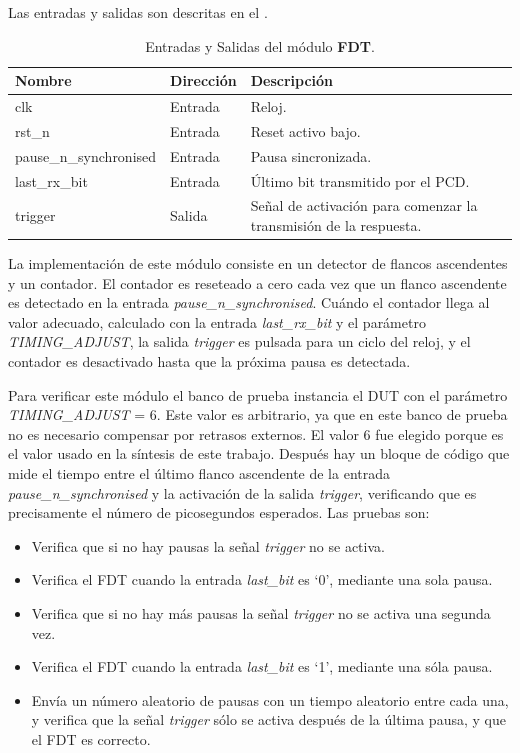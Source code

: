 \documentclass[a4paper, twoside, 11pt]{report}
\begin{document}
Las entradas y salidas son descritas en el .

\begin{table}[htb]
  \centering
  \tablezebra
  \begin{tabulary}{\linewidth}{l|l|L}
    \setcounter{rownum}{0}
    \textbf{Nombre}&\textbf{Dirección}&\textbf{Descripción} \\
    \hline
    clk&Entrada&Reloj. \\
    rst\_n&Entrada&Reset activo bajo. \\
    pause\_n\_synchronised&Entrada&Pausa sincronizada. \\
    last\_rx\_bit&Entrada&Último bit transmitido por el PCD. \\
    trigger&Salida&Señal de activación para comenzar la transmisión de la respuesta. \\
  \end{tabulary}
  \caption{Entradas y Salidas del módulo \textbf{FDT}.}
  \label{tab:ports_fdt}
\end{table}

La implementación de este módulo consiste en un detector de flancos ascendentes y un contador. El contador es reseteado a cero cada vez que un flanco ascendente es detectado en la entrada \textit{pause\_n\_synchronised}. Cuándo el contador llega al valor adecuado, calculado con la entrada \textit{last\_rx\_bit} y el parámetro \textit{TIMING\_ADJUST}, la salida \textit{trigger} es pulsada para un ciclo del reloj, y el contador es desactivado hasta que la próxima pausa es detectada.

Para verificar este módulo el banco de prueba instancia el DUT con el parámetro \textit{TIM\-ING\_ADJUST} = 6. Este valor es arbitrario, ya que en este banco de prueba no es necesario compensar por retrasos externos. El valor 6 fue elegido porque es el valor usado en la síntesis de este trabajo. Después hay un bloque de código que mide el tiempo entre el último flanco ascendente de la entrada \textit{pause\_n\_synchronised} y la activación de la salida \textit{trigger}, verificando que es precisamente el número de picosegundos esperados. Las pruebas son:

\begin{itemize}
  \item Verifica que si no hay pausas la señal \textit{trigger} no se activa.
  \item Verifica el FDT cuando la entrada \textit{last\_bit} es ‘0’, mediante una sola pausa.
  \item Verifica que si no hay más pausas la señal \textit{trigger} no se activa una segunda vez.
  \item Verifica el FDT cuando la entrada \textit{last\_bit} es ‘1’, mediante una sóla pausa.
  \item Envía un número aleatorio de pausas con un tiempo aleatorio entre cada una, y verifica que la señal \textit{trigger} sólo se activa después de la última pausa, y que el FDT es correcto.
\end{itemize}
\end{document}
